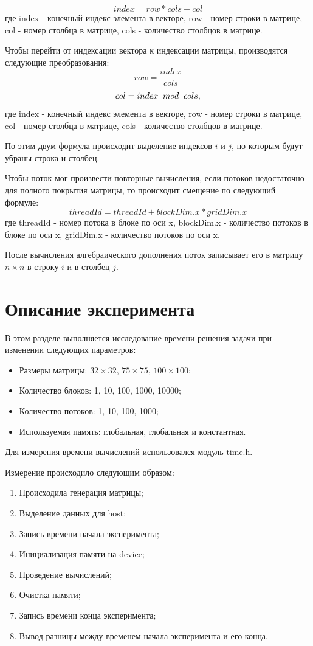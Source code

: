 \documentclass[a4paper, final]{article}
\begin{document}
$$index=row * cols + col$$
где index - конечный индекс элемента в векторе,
row - номер строки в матрице,
col - номер столбца в матрице,
cols - количество столбцов в матрице. 

Чтобы перейти от индексации вектора к индексации матрицы, производятся следующие преобразования:
$$row= \frac{index}{cols}$$
$$col=index \hspace{2mm} mod \hspace{2mm} cols,$$
где index - конечный индекс элемента в векторе,
row - номер строки в матрице,
col - номер столбца в матрице,
cols - количество столбцов в матрице.

По этим двум формула происходит выделение индексов  $i$ и $j$, по которым будут убраны строка и столбец. 

Чтобы поток мог произвести повторные вычисления, если потоков недостаточно для полного покрытия матрицы, то происходит смещение по следующий формуле:
$$threadId = threadId + blockDim.x * gridDim.x$$
где threadId - номер потока в блоке по оси x, 
blockDim.x - количество потоков в блоке по оси x,
gridDim.x - количество потоков по оси x.

После вычисления алгебраического дополнения поток записывает его в матрицу $n \times n$ в строку $i$ и в столбец $j$. 

\newpage
\section{Описание эксперимента}

В этом разделе выполняется исследование времени решения задачи при изменении следующих параметров:
\begin{itemize}
    \item Размеры матрицы: $32 \times 32$, $75 \times 75$, $100 \times 100$;
    \item Количество блоков: 1, 10, 100, 1000, 10000;
    \item Количество потоков: 1, 10, 100, 1000;
    \item Используемая память: глобальная, глобальная и константная.
\end{itemize}

Для измерения времени вычислений использовался модуль time.h. 

Измерение происходило следующим образом:
\begin{enumerate}
    \item Происходила генерация матрицы;
    \item Выделение данных для host;
    \item Запись времени начала эксперимента;
    \item Инициализация памяти на device;
    \item Проведение вычислений;
    \item Очистка памяти;
    \item Запись времени конца эксперимента;
    \item Вывод разницы между временем начала эксперимента и его конца.
\end{enumerate}
\end{document}
